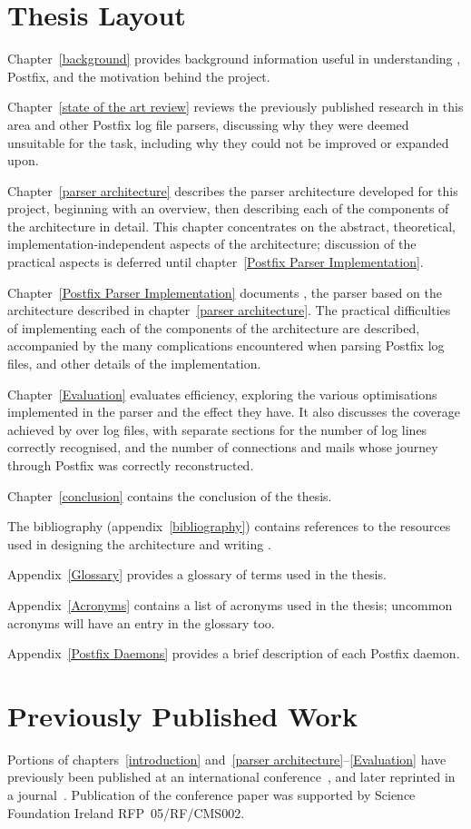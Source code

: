 \section{Thesis Layout}

Chapter~\ref{background} provides background information useful in
understanding , Postfix, and the motivation behind the
project.

Chapter~\ref{state of the art review} reviews the previously published
research in this area and other Postfix log file parsers, discussing why
they were deemed unsuitable for the task, including why they could not be
improved or expanded upon.

Chapter~\ref{parser architecture} describes the parser architecture
developed for this project, beginning with an overview, then describing
each of the components of the architecture in detail.  This chapter
concentrates on the abstract, theoretical, implementation-independent
aspects of the architecture; discussion of the practical aspects is
deferred until chapter~\ref{Postfix Parser Implementation}.

Chapter~\ref{Postfix Parser Implementation} documents \parsername{}, the
parser based on the architecture described in chapter~\ref{parser
architecture}.  The practical difficulties of implementing each of the
components of the architecture are described, accompanied by the many
complications encountered when parsing Postfix log files, and other details
of the implementation.

Chapter~\ref{Evaluation} evaluates \parsernames{} efficiency, exploring
the various optimisations implemented in the parser and the effect they
have.  It also discusses the coverage achieved by \parsername{} over
\numberOFlogFILES{} log files, with separate sections for the number of log
lines correctly recognised, and the number of connections and mails whose
journey through Postfix was correctly reconstructed.

Chapter~\ref{conclusion} contains the conclusion of the thesis.

The bibliography (appendix~\ref{bibliography}) contains references to the
resources used in designing the architecture and writing \parsername{}.

Appendix~\ref{Glossary} provides a glossary of terms used in the thesis.

Appendix~\ref{Acronyms} contains a list of acronyms used in the thesis;
uncommon acronyms will have an entry in the glossary too.

Appendix~\ref{Postfix Daemons} provides a brief description of each Postfix
daemon.

\section{Previously Published Work}

Portions of chapters~\ref{introduction} and~\ref{parser
architecture}--\ref{Evaluation} have previously been published at an
international conference~\cite{sgai-2008}, and later reprinted in a
journal~\cite{elsevier-2009}.  Publication of the conference paper was
supported by Science Foundation Ireland RFP~05/RF/CMS002.
